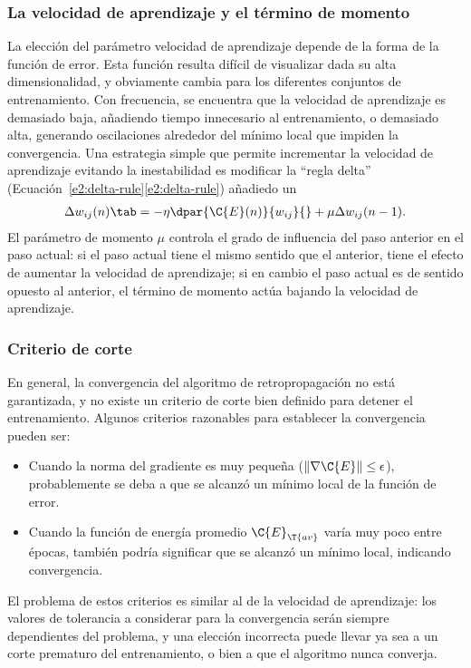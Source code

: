 \subsubsection{La velocidad de aprendizaje y el término de momento}
%
La elección del parámetro velocidad de aprendizaje depende de la forma
de la función de error. Esta función resulta difícil de visualizar
dada su alta dimensionalidad, y obviamente cambia para los diferentes
conjuntos de entrenamiento.  Con frecuencia, se encuentra que la
velocidad de aprendizaje es demasiado baja, añadiendo tiempo
innecesario al entrenamiento, o demasiado alta, generando oscilaciones
alrededor del mínimo local que impiden la convergencia.
Una estrategia simple que permite incrementar la velocidad de aprendizaje
evitando la inestabilidad es modificar la ``regla delta''
(\iflatexml{}Ecuación~\ref{e2:delta-rule}\else\autoref{e2:delta-rule}\fi)
añadiedo un 
%
\begin{align}\label{e2:momentum-term}
  \Delta w_{ij}(n)\tab=-\eta\dpar{\C{E}(n)}{w_{ij}}{}
  +\mu\Delta w_{ij}(n-1).
\end{align}
%
El parámetro de momento $\mu$ controla el grado de influencia del paso
anterior en el paso actual: si el paso actual tiene el mismo sentido
que el anterior, tiene el efecto de aumentar la velocidad de
aprendizaje; si en cambio el paso actual es de sentido opuesto al
anterior, el término de momento actúa bajando la velocidad de
aprendizaje.
%
\subsubsection{Criterio de corte}
%
En general, la convergencia del algoritmo de retropropagación no está
garantizada, y no existe un criterio de corte bien definido para
detener el entrenamiento. Algunos criterios razonables para establecer
la convergencia pueden ser:
%
\begin{itemize}
\item Cuando la norma del gradiente es muy pequeña
  ($\|\nabla\C{E}\|\leq\epsilon$), probablemente se deba a que se
  alcanzó un mínimo local de la función de error.
\item Cuando la función de energía promedio $\C{E}_{\T{av}}$ varía muy
  poco entre épocas, también podría significar que se alcanzó un
  mínimo local, indicando convergencia.
\end{itemize}
%
El problema de estos criterios es similar al de la velocidad de
aprendizaje: los valores de tolerancia a considerar para la
convergencia serán siempre dependientes del problema, y una elección
incorrecta puede llevar ya sea a un corte prematuro del entrenamiento,
o bien a que el algoritmo nunca converja.

